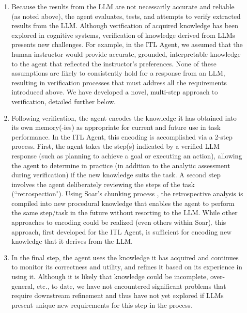 \documentclass[letterpaper]{article} %
\begin{document}
\begin{enumerate}
\item Because the results from the LLM are not necessarily accurate and reliable (as noted above), the agent evaluates, tests, and attempts to verify extracted results from the LLM. Although verification of acquired knowledge has been explored in cognitive systems, verification of knowledge derived from LLMs presents new challenges. For example, in the ITL Agent, we assumed that the human instructor would provide accurate, grounded, interpretable knowledge to the agent that reflected the instructor's preferences. None of these assumptions are likely to consistently hold for a response from an LLM, resulting in verification processes that must address all the requirements introduced above. We have developed a novel, multi-step approach to verification, detailed further below.

\item Following verification, the agent encodes the knowledge it has obtained into its own memory(-ies) as appropriate for current and future use in task performance. In the ITL Agent, this encoding is accomplished via a 2-step process. First, the agent takes the step(s) indicated by a verified LLM response (such as planning to achieve a goal or executing an action), allowing the agent to determine in practice (in addition to the analytic assessment during verification) if the new knowledge suits the task. A second step involves the agent deliberately reviewing the steps of the task (``retrospection"). Using Soar's chunking process \cite{laird_chunking_1986}, the retrospective analysis is compiled into new procedural knowledge that enables the agent to perform the same step/task in the future without resorting to the LLM. While other approaches to encoding could be realized (even others within Soar), this approach, first developed for the ITL Agent, is sufficient for encoding new knowledge that it derives from the LLM.

\item In the final step, the agent uses the knowledge it has acquired and continues to monitor its correctness and utility, and refines it based on its experience in using it. Although it is likely that knowledge could be incomplete, over-general, etc., to date, we have not encountered significant problems that require downstream refinement and thus have not yet explored if LLMs present unique new requirements for this step in the process.



\end{enumerate}
\end{document}
